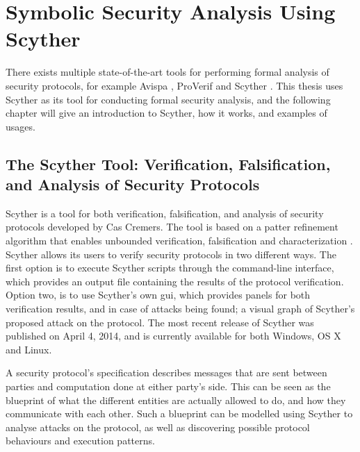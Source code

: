 \chapter{Symbolic Security Analysis Using Scyther}
\label{chp:scyther} 


There exists multiple state-of-the-art tools for performing formal analysis of security protocols, for example Avispa \cite{avispa}, ProVerif \cite{proverif} and Scyther \cite{scyther}. This thesis uses Scyther as its tool for conducting formal security analysis, and the following chapter will give an introduction to Scyther, how it works, and examples of usages.


\section{The Scyther Tool: Verification, Falsification, and Analysis of Security Protocols}

Scyther is a tool for both verification, falsification, and analysis of security protocols developed by Cas Cremers. The tool is based on a patter refinement algorithm that enables unbounded verification, falsification and characterization \cite{cremers2008scyther}. Scyther allows its users to verify security protocols in two different ways. The first option is to execute Scyther scripts through the command-line interface, which provides an output file containing the results of the protocol verification. Option two, is to use Scyther's own \gls{gui}, which provides panels for both verification results, and in case of attacks being found; a visual graph of Scyther's proposed attack on the protocol. The most recent release of Scyther was published on April 4, 2014, and is currently available for both Windows, OS X and Linux.

A security protocol's specification describes messages that are sent between parties and computation done at either party's side. This can be seen as the blueprint of what the different entities are actually allowed to do, and how they communicate with each other. Such a blueprint can be modelled using Scyther to analyse attacks on the protocol, as well as discovering possible protocol behaviours and execution patterns.

